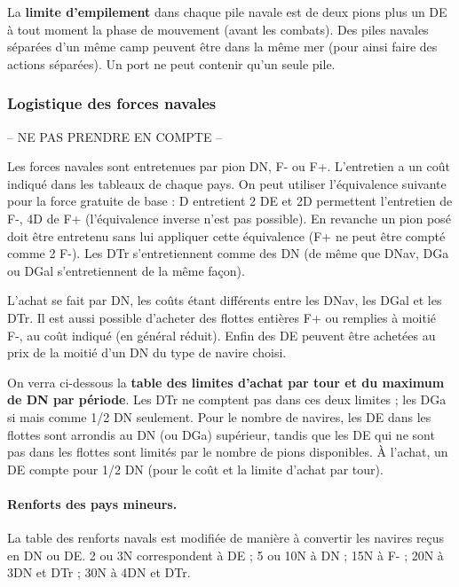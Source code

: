 La \textbf{limite d'empilement} dans chaque pile navale 
est de deux pions plus un DE à tout moment
la phase de mouvement (avant les combats). Des piles
navales séparées d'un même camp peuvent  être dans la même
mer (pour ainsi faire des
actions séparées). Un port ne peut contenir qu'un seule pile.


\subsubsection{Logistique des forces navales}
-- NE PAS PRENDRE EN COMPTE --

Les forces navales sont entretenues par pion DN, F- ou F+. L'entretien 
a un coût indiqué dans les tableaux de chaque pays. On peut
utiliser l'équivalence suivante pour la force gratuite de base : D entretient 2 DE et
2D permettent l'entretien de F-, 4D de F+ (l'équivalence inverse n'est pas possible).
En revanche un pion posé doit être entretenu sans lui appliquer cette 
équivalence (F+ ne peut être compté comme 2 F-). Les DTr s'entretiennent comme des
DN (de même que DNav, DGa ou DGal s'entretiennent de la même façon).

L'achat se fait par DN, les coûts étant différents entre les DNav,
les DGal et les DTr. Il est aussi possible d'acheter des flottes entières F+
ou remplies à moitié F-, au coût indiqué (en général réduit). Enfin
des DE peuvent être achetées au prix de la moitié d'un DN du type
de navire choisi.

On verra ci-dessous la \textbf{table des limites d'achat par tour et du maximum
de DN par période}. Les DTr ne comptent pas dans ces deux limites ; les DGa si mais
comme 1/2 DN seulement.
Pour le nombre de navires, les DE dans les flottes sont arrondis au DN (ou DGa) 
supérieur, tandis que les DE qui ne sont pas dans les flottes sont limités par
le nombre de pions disponibles. À l'achat, un DE compte pour 1/2 DN (pour
le coût et la limite d'achat par tour).

\paragraph{Renforts des pays mineurs.}
La table des renforts navals est modifiée de manière à convertir
les navires reçus en DN ou DE. 2 ou 3N correspondent à DE ;
5 ou 10N à DN ; 15N à F- ; 20N à 3DN et DTr ; 30N à 4DN et DTr.


